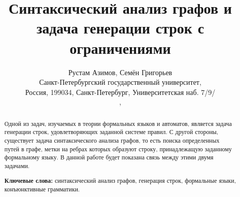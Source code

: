 \documentclass[10pt]{article}
\begin{document}
\title{Синтаксический анализ графов и задача генерации строк с ограничениями}
\author{Рустам Азимов, Семён Григорьев \\ 
Санкт-Петербургский государственный университет, \\
Россия, 199034, Санкт-Петербург, Университетская наб. 7/9/ \\ 
, 
}

\maketitle

\begin{abstract}
Одной из задач, изучаемых в теории формальных языков и автоматов, является задача генерации строк, удовлетворяющих заданной системе правил. С другой стороны, существует задача синтаксического анализа графов, то есть поиска определенных путей в графе, метки на ребрах которых образуют строку, принадлежащую заданному формальному языку. В данной работе будет показана связь между этими двумя задачами.

\vspace{1em}
\textbf{Ключевые слова:} синтаксический анализ графов, генерация строк, формальные языки, конъюнктивные грамматики.

\end{abstract}







\setmonofont[Mapping=tex-text]{CMU Typewriter Text}


\end{document}
